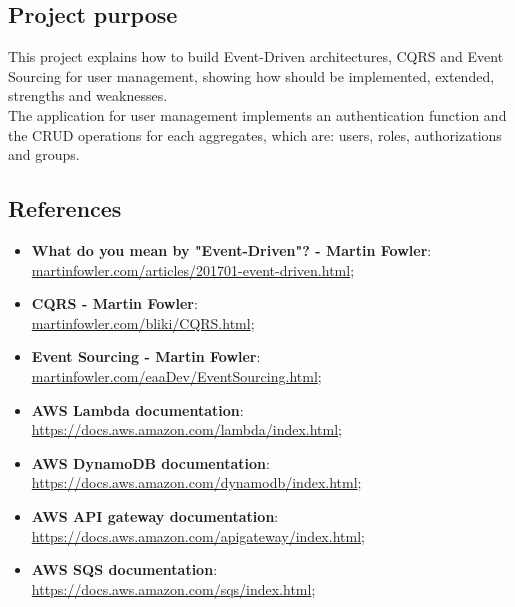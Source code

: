 \subsection{Project purpose}
This project explains how to build Event-Driven architectures, CQRS and Event Sourcing for user management, showing how should be implemented, extended, strengths and weaknesses.\\
The application for user management implements an authentication function and the CRUD operations for each aggregates, which are: users, roles, authorizations and groups.

\subsection{References}
\begin{itemize}
	\item \textbf{What do you mean by "Event-Driven"? - Martin Fowler}:\\ \url{martinfowler.com/articles/201701-event-driven.html};
	\item \textbf{CQRS - Martin Fowler}:\\ \url{martinfowler.com/bliki/CQRS.html};
	\item \textbf{Event Sourcing - Martin Fowler}:\\ \url{martinfowler.com/eaaDev/EventSourcing.html};
	\item \textbf{AWS Lambda documentation}:\\ \url{https://docs.aws.amazon.com/lambda/index.html};
	\item \textbf{AWS DynamoDB documentation}:\\ \url{https://docs.aws.amazon.com/dynamodb/index.html};
	\item \textbf{AWS API gateway documentation}:\\ \url{https://docs.aws.amazon.com/apigateway/index.html};
	\item \textbf{AWS SQS documentation}:\\ \url{https://docs.aws.amazon.com/sqs/index.html};
\end{itemize}
\pagebreak
